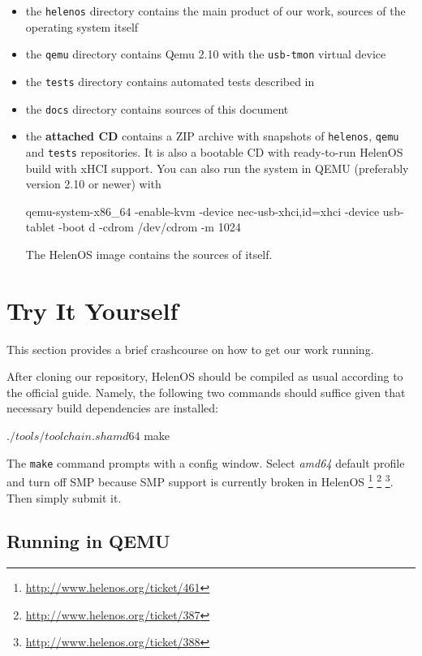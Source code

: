 \begin{itemize}
\item the \texttt{helenos} directory contains the main product of our work,
sources of the operating system itself
\item the \texttt{qemu} directory contains Qemu 2.10 with the \texttt{usb-tmon} virtual device
\item the \texttt{tests} directory contains automated tests described in 
\item the \texttt{docs} directory contains sources of this document
\item the \textbf{attached CD} contains a ZIP archive with snapshots of \texttt{helenos},
\texttt{qemu} and \texttt{tests} repositories. It is also a bootable CD with
ready-to-run HelenOS build with xHCI support. You can also run the system in
QEMU (preferably version 2.10 or newer) with
\begin{bdsh}
qemu-system-x86_64 -enable-kvm -device nec-usb-xhci,id=xhci -device usb-tablet -boot d -cdrom /dev/cdrom -m 1024
\end{bdsh}
The HelenOS image contains the sources of itself.
\end{itemize}


\section{Try It Yourself}

This section provides a brief crashcourse on how to get our work running.

After cloning our repository, HelenOS should be compiled as usual according to
the official guide. Namely, the following two commands should suffice given
that necessary build dependencies are installed:

\begin{bdsh}
$ ./tools/toolchain.sh amd64
$ make
\end{bdsh}

The \texttt{make} command prompts with a config window. Select \textit{amd64}
default profile and turn off SMP because SMP support is currently broken in
HelenOS \footnote{\href{http://www.helenos.org/ticket/461}{http://www.helenos.org/ticket/461}}
\footnote{\href{http://www.helenos.org/ticket/387}{http://www.helenos.org/ticket/387}}
\footnote{\href{http://www.helenos.org/ticket/388}{http://www.helenos.org/ticket/388}}. Then simply submit it.

\subsection{Running in QEMU}

